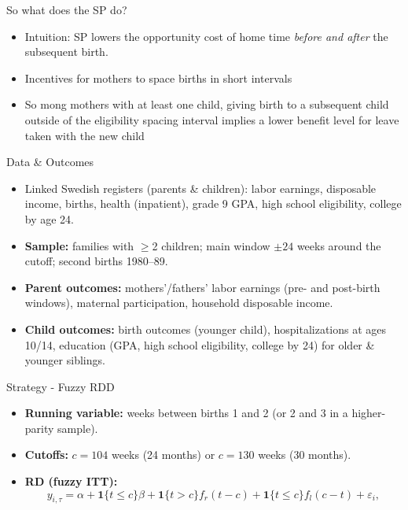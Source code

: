 \documentclass[11pt,notes=hide,aspectratio=169,mathserif]{beamer}
\begin{document}
\begin{frame}{So what does the SP do?}
\small
\pause 
\begin{itemize}
  \item Intuition: SP lowers the opportunity cost of home time \emph{before and after} the subsequent birth.
  \item Incentives for mothers to space births in short intervals
  \item So mong mothers with at
  least one child, giving birth to a subsequent child outside of the eligibility spacing interval implies a lower benefit level for leave taken with the new child
\end{itemize}
\end{frame}

\begin{frame}{Data \& Outcomes}
\small
\begin{itemize}
  \item Linked Swedish registers (parents \& children): labor earnings, disposable income, births, health (inpatient), grade 9 GPA, high school eligibility, college by age 24.
  \item \textbf{Sample:} families with \(\ge\)2 children; main window \(\pm24\) weeks around the cutoff; second births 1980–89.
  \item \textbf{Parent outcomes:} mothers’/fathers’ labor earnings (pre- and post-birth windows), maternal participation, household disposable income.
  \item \textbf{Child outcomes:} birth outcomes (younger child), hospitalizations at ages 10/14, education (GPA, high school eligibility, college by 24) for older \& younger siblings.
\end{itemize}
\end{frame}



\begin{frame}{Strategy - Fuzzy RDD}
\small
\begin{itemize}
  \item \textbf{Running variable:} weeks between births 1 and 2 (or 2 and 3 in a higher-parity sample).
  \item \textbf{Cutoffs:} \(c=104\) weeks (24 months) or \(c=130\) weeks (30 months).
  \item \textbf{RD (fuzzy ITT):}
  \[
  y_{i,\tau}=\alpha + \mathbf{1}\{t\le c\}\beta + \mathbf{1}\{t>c\}f_r(t-c)+\mathbf{1}\{t\le c\}f_l(c-t)+\varepsilon_i,
  \]
\end{itemize}
\end{frame}
\end{document}
